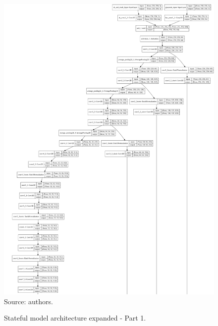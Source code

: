 \documentclass[12pt,openright,oneside,a4paper,english, brazilian]{abntex2}
\begin{document}
\begin{otherlanguage}{english}
\begin{figure}[!htb]
\centering
\caption{Stateful model architecture expanded - Part 1.}
\includegraphics[height = \textheight - 1.5cm]{model_plot/Stateful1}
Source: authors.
\label{stateful_plot_1}
\end{figure}


\end{otherlanguage}
\end{document}
